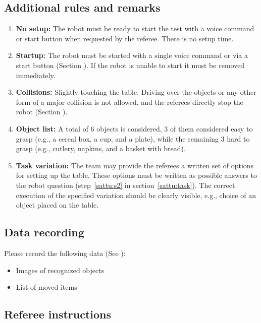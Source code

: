 \subsection{Additional rules and remarks}
\label{sattu:add}
\begin{enumerate}
\item \textbf{No setup:} The robot must be ready to start the test with a voice command or start button when requested by the referee. There is no setup time.
\item \textbf{Startup:} The robot must be started with a single voice command or via a start button (Section ). If the robot is unable to start it must be removed immediately.
\item \textbf{Collisions:} Slightly touching the table.
  Driving over the objects or any other form of a major collision is not allowed, and the referees directly stop the robot (Section ).
\item \textbf{Object list:} A total of 6 objects is considered, 3 of them considered easy to grasp (e.g., a cereal box, a cup, and a plate), while the remaining 3 hard to grasp (e.g., cutlery, napkins, and a basket with bread).
\item \textbf{Task variation:} The team may provide the referees a written set of options for setting up the table. These options must be written as possible answers to the robot question (step~\ref{sattu:s2} in section~\ref{sattu:task}). The correct execution of the specified variation should be clearly visible, e.g., choice of an object placed on the table.
\end{enumerate}

\subsection{Data recording}
  Please record the following data (See ):
  \begin{itemize}
   \item Images of recognized objects
   \item List of moved items
  \end{itemize}

\subsection{Referee instructions}

